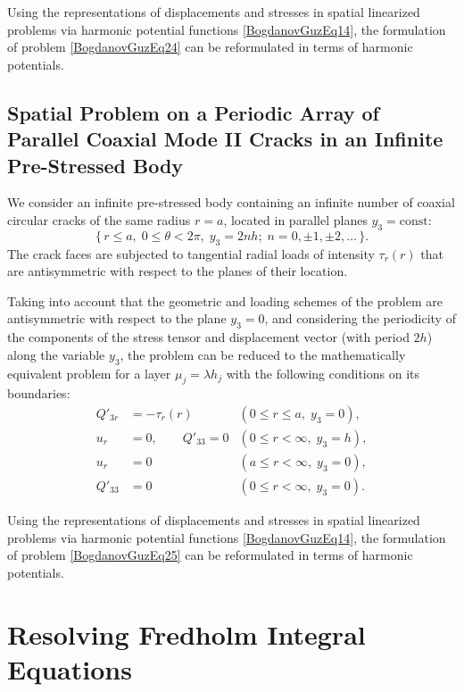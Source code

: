 Using the representations of displacements and stresses in spatial linearized problems via harmonic potential functions \eqref{BogdanovGuzEq14}, the formulation of problem \eqref{BogdanovGuzEq24} can be reformulated in terms of harmonic potentials.

\subsection{Spatial Problem on a Periodic Array of Parallel Coaxial Mode II Cracks in an Infinite Pre-Stressed Body}

\noindent 

\noindent We consider an infinite pre-stressed body containing an infinite number of coaxial circular cracks of the same radius $r=a$, located in parallel planes $y_{3}=\mathrm{const}$:
\[
\{\, r\le a,\; 0\le \theta <2\pi,\; y_{3}=2nh;\; n=0,\pm1,\pm2,\ldots \,\}.
\]
The crack faces are subjected to tangential radial loads of intensity $\tau_r(r)$ that are antisymmetric with respect to the planes of their location. 

Taking into account that the geometric and loading schemes of the problem are antisymmetric with respect to the plane $y_{3}=0$, and considering the periodicity of the components of the stress tensor and displacement vector (with period $2h$) along the variable $y_{3}$, the problem can be reduced to the mathematically equivalent problem for a layer $\mu_j=\lambda h_j$ with the following conditions on its boundaries:
\begin{align}
	\nonumber
	Q'_{3r} &= -\tau_r(r)
	& (0\le r\le a,\; y_{3}=0),
	\\
	\nonumber
	u_r &= 0, \qquad
	Q'_{33} = 0
	& (0\le r<\infty,\; y_{3}=h),
	\\
	\nonumber
	u_r &= 0
	& (a\le r<\infty,\; y_{3}=0),
	\\
		\label{BogdanovGuzEq25}
	Q'_{33} &= 0
	& (0\le r<\infty,\; y_{3}=0).
\end{align}

Using the representations of displacements and stresses in spatial linearized problems via harmonic potential functions \eqref{BogdanovGuzEq14}, the formulation of problem \eqref{BogdanovGuzEq25} can be reformulated in terms of harmonic potentials.

\section{Resolving Fredholm Integral Equations}

